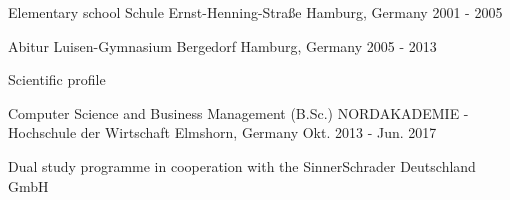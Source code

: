 

\begin{cventries}

  \cventry
    {Elementary school} %
    {Schule Ernst-Henning-Straße} %
    {Hamburg, Germany} %
    {2001 - 2005} %
    {}

  \cventry
    {Abitur} %
    {Luisen-Gymnasium Bergedorf} %
    {Hamburg, Germany} %
    {2005 - 2013} %
    {
      \begin{cvitems} %
        \item {Scientific profile}
      \end{cvitems}
    }

  \cventry
    {Computer Science and Business Management (B.Sc.)} %
    {NORDAKADEMIE - Hochschule der Wirtschaft} %
    {Elmshorn, Germany} %
    {Okt. 2013 - Jun. 2017} %
    {
      \begin{cvitems} %
        \item {Dual study programme in cooperation with the SinnerSchrader Deutschland GmbH}
      \end{cvitems}
    }

\end{cventries}
